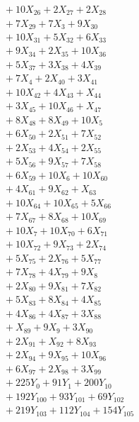 \documentclass[a4paper,10pt]{article}
\begin{document}
{\begin{align}
&\quad  + 10X_{26} + 2X_{27} + 2X_{28} \\[0.5ex]
&\quad  + 7X_{29} + 7X_{3} + 9X_{30} \\[0.5ex]
&\quad  + 10X_{31} + 5X_{32} + 6X_{33} \\[0.5ex]
&\quad  + 9X_{34} + 2X_{35} + 10X_{36} \\[0.5ex]
&\quad  + 5X_{37} + 3X_{38} + 4X_{39} \\[0.5ex]
&\quad  + 7X_{4} + 2X_{40} + 3X_{41} \\[0.5ex]
&\quad  + 10X_{42} + 4X_{43} + X_{44} \\[0.5ex]
&\quad  + 3X_{45} + 10X_{46} + X_{47} \\[0.5ex]
&\quad  + 8X_{48} + 8X_{49} + 10X_{5} \\[0.5ex]
&\quad  + 6X_{50} + 2X_{51} + 7X_{52} \\[0.5ex]
&\quad  + 2X_{53} + 4X_{54} + 2X_{55} \\[0.5ex]
&\quad  + 5X_{56} + 9X_{57} + 7X_{58} \\[0.5ex]
&\quad  + 6X_{59} + 10X_{6} + 10X_{60} \\[0.5ex]
&\quad  + 4X_{61} + 9X_{62} + X_{63} \\[0.5ex]
&\quad  + 10X_{64} + 10X_{65} + 5X_{66} \\[0.5ex]
&\quad  + 7X_{67} + 8X_{68} + 10X_{69} \\[0.5ex]
&\quad  + 10X_{7} + 10X_{70} + 6X_{71} \\[0.5ex]
&\quad  + 10X_{72} + 9X_{73} + 2X_{74} \\[0.5ex]
&\quad  + 5X_{75} + 2X_{76} + 5X_{77} \\[0.5ex]
&\quad  + 7X_{78} + 4X_{79} + 9X_{8} \\[0.5ex]
&\quad  + 2X_{80} + 9X_{81} + 7X_{82} \\[0.5ex]
&\quad  + 5X_{83} + 8X_{84} + 4X_{85} \\[0.5ex]
&\quad  + 4X_{86} + 4X_{87} + 3X_{88} \\[0.5ex]
&\quad  + X_{89} + 9X_{9} + 3X_{90} \\[0.5ex]
&\quad  + 2X_{91} + X_{92} + 8X_{93} \\[0.5ex]
&\quad  + 2X_{94} + 9X_{95} + 10X_{96} \\[0.5ex]
&\quad  + 6X_{97} + 2X_{98} + 3X_{99} \\[0.5ex]
&\quad  + 225Y_{0} + 91Y_{1} + 200Y_{10} \\[0.5ex]
&\quad  + 192Y_{100} + 93Y_{101} + 69Y_{102} \\[0.5ex]
&\quad  + 219Y_{103} + 112Y_{104} + 154Y_{105} \\[0.5ex]

\end{align}}
\end{document}
